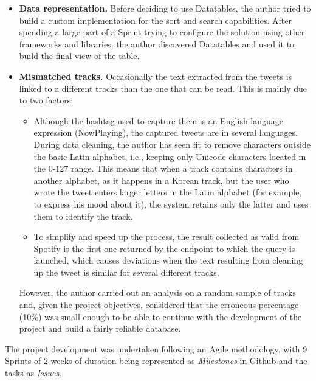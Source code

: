 \begin{itemize}
	\item \textbf{Data representation.} Before deciding to use Datatables, the author tried to build a custom implementation for the sort and search capabilities. After spending a large part of a Sprint trying to configure the solution using other frameworks and libraries, the author discovered Datatables and used it to build the final view of the table.
	\item \textbf{Mismatched tracks.} Occasionally the text extracted from the tweets is linked to a different tracks than the one that can be read. This is mainly due to two factors:
	\begin{itemize}
		\item Although the hashtag used to capture them is an English language expression (NowPlaying), the captured tweets are in several languages. During data cleaning, the author has seen fit to remove characters outside the basic Latin alphabet, i.e., keeping only Unicode characters located in the 0-127 range. This means that when a track contains characters in another alphabet, as it happens in a Korean track, but the user who wrote the tweet enters larger letters in the Latin alphabet (for example, to express his mood about it), the system retains only the latter and uses them to identify the track.
		\item To simplify and speed up the process, the result collected as valid from Spotify is the first one returned by the endpoint to which the query is launched, which causes deviations when the text resulting from cleaning up the tweet is similar for several different tracks.
	\end{itemize}
	However, the author carried out an analysis on a random sample of tracks and, given the project objectives, considered that the erroneous percentage (10\%) was small enough to be able to continue with the development of the project and build a fairly reliable database.
\end{itemize}

\nonzeroparskip The project development was undertaken following an Agile methodology, with 9 Sprints of 2 weeks of duration being represented as \textit{Milestones} in Github and the tasks as \textit{Issues}.